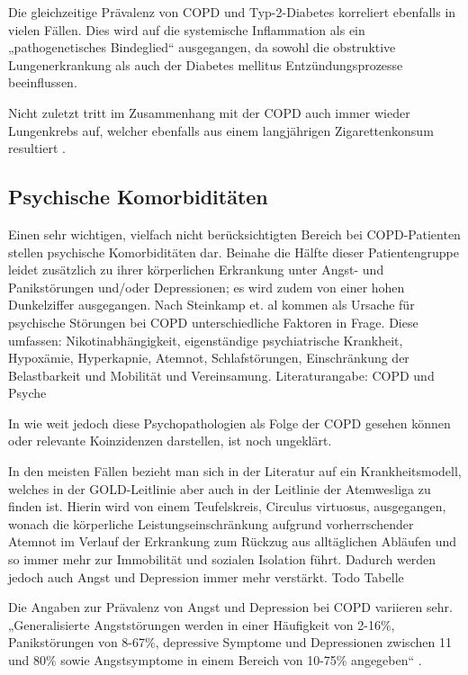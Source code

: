 Die gleichzeitige Prävalenz von COPD und Typ-2-Diabetes korreliert ebenfalls in vielen Fällen. Dies wird auf die systemische Inflammation als ein „pathogenetisches Bindeglied“ ausgegangen, da sowohl die obstruktive Lungenerkrankung als auch der Diabetes mellitus Entzündungsprozesse beeinflussen.

Nicht zuletzt tritt im Zusammenhang mit der COPD auch immer wieder Lungenkrebs auf, welcher ebenfalls aus einem langjährigen Zigarettenkonsum resultiert \autocite[vgl.][38]{stiefelhagen2013}.


\subsection{Psychische Komorbiditäten}
\label{psychische_komorbiditaet}
Einen sehr wichtigen, vielfach nicht berücksichtigten Bereich bei COPD-Patienten stellen psychische Komorbiditäten dar.  Beinahe die Hälfte dieser Patientengruppe leidet zusätzlich zu ihrer körperlichen Erkrankung unter Angst- und Panikstörungen und/oder Depressionen; es wird zudem von einer hohen Dunkelziffer ausgegangen. Nach Steinkamp et. al kommen als Ursache für psychische Störungen bei COPD unterschiedliche Faktoren in Frage. Diese umfassen: Nikotinabhängigkeit, eigenständige psychiatrische Krankheit, Hypoxämie, Hyperkapnie, Atemnot, Schlafstörungen, Einschränkung der Belastbarkeit und Mobilität und Vereinsamung. Literaturangabe: COPD und Psyche 
 
In wie weit jedoch diese Psychopathologien als Folge der COPD gesehen können oder relevante Koinzidenzen darstellen, ist noch ungeklärt. 

In den meisten Fällen bezieht man sich in der Literatur auf ein Krankheitsmodell, welches in der GOLD-Leitlinie aber auch in der Leitlinie der Atemwesliga zu finden ist. Hierin wird von einem Teufelskreis, Circulus virtuosus, ausgegangen, wonach die körperliche Leistungseinschränkung aufgrund vorherrschender Atemnot im Verlauf der Erkrankung zum Rückzug aus alltäglichen Abläufen und so immer mehr zur Immobilität und sozialen Isolation führt. Dadurch werden jedoch auch Angst und Depression immer mehr verstärkt. Todo Tabelle 

Die Angaben zur Prävalenz von Angst und Depression bei COPD variieren sehr. „Generalisierte Angststörungen werden in einer Häufigkeit von 2-16\%, Panikstörungen von 8-67\%, depressive Symptome und Depressionen zwischen 11 und 80\% sowie Angstsymptome in einem Bereich von 10-75\% angegeben“  \autocite[34]{kenn2011}.

